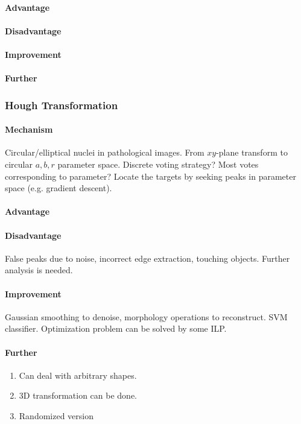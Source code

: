 \documentclass[10pt,a4paper]{article}
\begin{document}
\paragraph{Advantage}
\paragraph{Disadvantage}
\paragraph{Improvement}
\paragraph{Further}

\subsubsection{Hough Transformation}
\paragraph{Mechanism}
Circular/elliptical nuclei in pathological images. From $xy$-plane transform to circular $a,b,r$ parameter space. Discrete voting strategy? Most votes corresponding to parameter? Locate the targets by seeking peaks in parameter space (e.g. gradient descent). 
\paragraph{Advantage}
\paragraph{Disadvantage}
False peaks due to noise, incorrect edge extraction, touching objects. Further analysis is needed. 
\paragraph{Improvement}
Gaussian smoothing to denoise, morphology operations to reconstruct. SVM classifier. Optimization problem can be solved by some ILP.
\paragraph{Further}
\begin{enumerate}
	\item Can deal with arbitrary shapes. 
	\item 3D transformation can be done.
	\item Randomized version
\end{enumerate}
\end{document}
